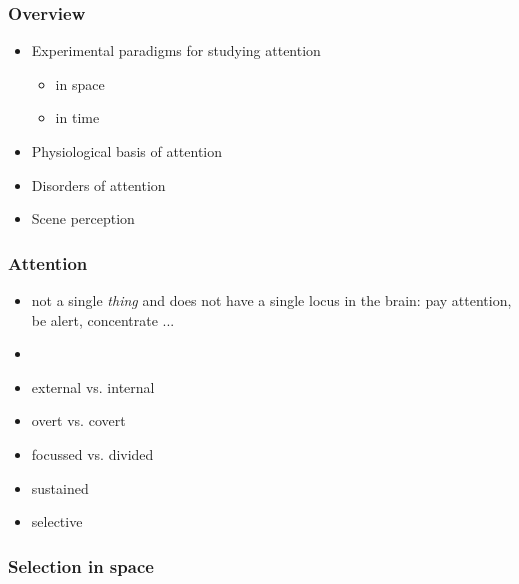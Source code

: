 \documentclass[]{beamer}
\begin{document}
\begin{frame}
 \frametitle{Overview}
\begin{itemize}[<+->]
  \setlength{\itemsep}{5pt}
 \item Experimental paradigms for studying attention
 \begin{itemize}
  \item in space
  \item in time
 \end{itemize}
 \item Physiological basis of attention
 \item Disorders of attention
 \item Scene perception
\end{itemize}
\end{frame}

\begin{frame}
\frametitle{Attention}
\begin{overlayarea}{110mm}{80mm}
\begin{itemize}
 \item<1-> not a single \textit{thing} and does not have a single locus in the brain: pay attention, be alert, concentrate ...
 \item[]
 \item<2-> external vs. internal
 \item<3-> overt vs. covert
 \item<4-> focussed vs. divided
 \item<5-> sustained
 \item<6-> selective
\end{itemize}
\end{overlayarea}
\end{frame}


\begin{frame}
 \frametitle{Selection in space}
\begin{overlayarea}{130mm}{75mm}

\end{overlayarea}
\end{frame}
\end{document}
